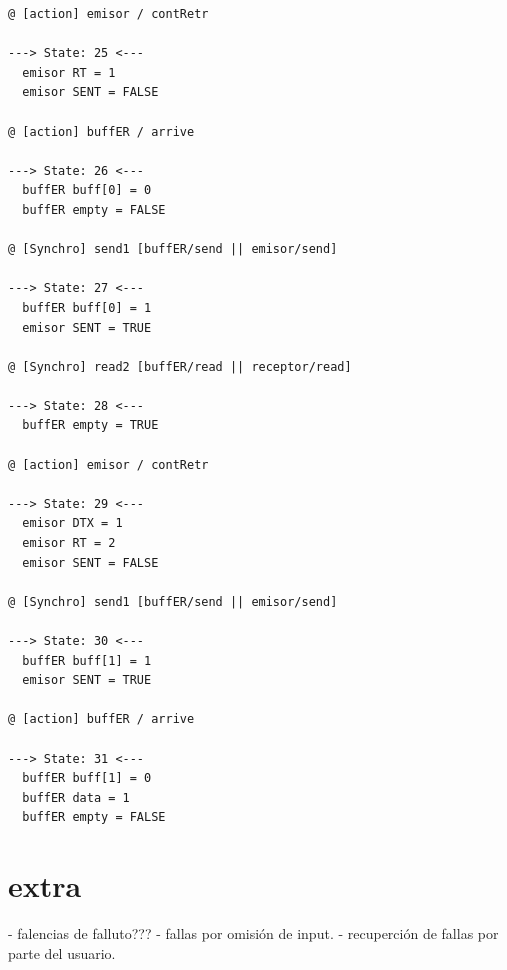 \documentclass[titlepage, 12pt]{book}
\begin{document}
{\begin{verbatim}
@ [action] emisor / contRetr

---> State: 25 <---
  emisor RT = 1
  emisor SENT = FALSE

@ [action] buffER / arrive

---> State: 26 <---
  buffER buff[0] = 0
  buffER empty = FALSE

@ [Synchro] send1 [buffER/send || emisor/send]

---> State: 27 <---
  buffER buff[0] = 1
  emisor SENT = TRUE

@ [Synchro] read2 [buffER/read || receptor/read]

---> State: 28 <---
  buffER empty = TRUE

@ [action] emisor / contRetr

---> State: 29 <---
  emisor DTX = 1
  emisor RT = 2
  emisor SENT = FALSE

@ [Synchro] send1 [buffER/send || emisor/send]

---> State: 30 <---
  buffER buff[1] = 1
  emisor SENT = TRUE

@ [action] buffER / arrive

---> State: 31 <---
  buffER buff[1] = 0
  buffER data = 1
  buffER empty = FALSE
\end{verbatim}
}


\chapter{extra}
	- falencias de falluto??? 
	- fallas por omisi\'on de input.
	- recuperci\'on de fallas por parte del usuario.




\newpage %
\end{document}
